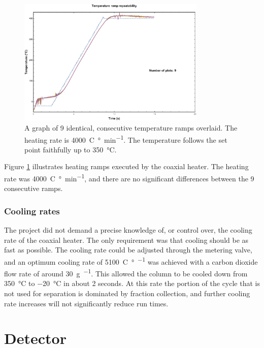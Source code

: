 \begin{figure}
	\centering
	\includegraphics[width=0.8\textwidth]{Figures/high_rate_heating.pdf}
	\decoRule
		
	\caption[Heating rate illustration]{A graph of 9 identical, consecutive
	temperature ramps overlaid. The heating rate is \SI{4000}{C\degree\per\minute}.
	The temperature follows the set point faithfully up to \SI{350}{\celsius}.}

	\label{fig:4000K/min} 
\end{figure}

Figure \ref{fig:4000K/min} illustrates heating ramps executed by the coaxial
heater. The heating rate was \SI{4000}{C\degree\per\minute}, and there are no
significant differences between the 9 consecutive ramps.

\subsubsection{Cooling rates}

The project did not demand a precise knowledge of, or control over, the cooling
rate of the coaxial heater. The only requirement was that cooling should be as
fast as possible. The cooling rate could be adjusted through the metering valve,
and an optimum cooling rate of \SI{5100}{C\degree\per\min} was achieved with a
carbon dioxide flow rate of around \SI{30}{\gram\per\min}. This allowed the
column to be cooled down from \SI{350}{\celsius} to \SI{-20}{\celsius} in about
2 seconds. At this rate the portion of the cycle that is not used for separation
is dominated by fraction collection, and further cooling rate increases will not
significantly reduce run times.

\section{Detector}

